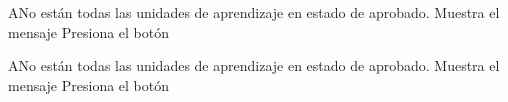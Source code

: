 
\begin{UCtrayectoriaA}{A}{No están todas las unidades de aprendizaje en estado de aprobado.}
    \UCpaso Muestra el mensaje  
    \UCpaso[\UCactor] Presiona el botón 
\end{UCtrayectoriaA}



\begin{UCtrayectoriaA}{A}{No están todas las unidades de aprendizaje en estado de aprobado.}
    \UCpaso Muestra el mensaje  
    \UCpaso[\UCactor] Presiona el botón 
\end{UCtrayectoriaA}

